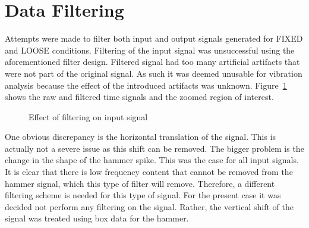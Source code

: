 \documentclass[paper=a4, fontsize=12pt]{scrartcl} %
\begin{document}
\section*{Data Filtering}
Attempts were made to filter both input and output signals generated for FIXED and LOOSE conditions. Filtering of the input signal was unsuccessful using the aforementioned filter design. Filtered signal had too many artificial artifacts that were not part of the original signal. As such it was deemed unusable for vibration analysis because the effect of the introduced artifacts was unknown. Figure~\ref{fig:inputSigFilter} shows the raw and filtered time signals and the zoomed region of interest.
%
	\begin{figure}[H]
		\centering
		\quad
		\caption{Effect of filtering on input signal}
		\label{fig:inputSigFilter}
	\end{figure}
%
One obvious discrepancy is the horizontal translation of the signal. This is actually not a severe issue as this shift can be removed. The bigger problem is the change in the shape of the hammer spike. This was the case for all input signals. It is clear that there is low frequency content that cannot be removed from the hammer signal, which this type of filter will remove. Therefore, a different filtering scheme is needed for this type of signal. For the present case it was decided not perform any filtering on the signal. Rather, the vertical shift of the signal was treated using box data for the hammer.
\end{document}
